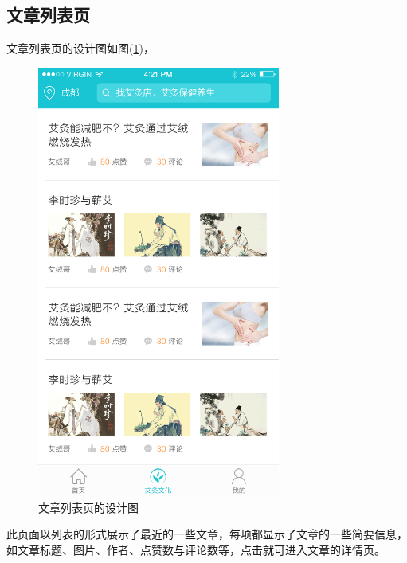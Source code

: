     \subsection{文章列表页}
      \label{subsec:文章列表页}
        文章列表页的设计图如图(\ref{fig:artlist_dsn})，
        \begin{figure}[htbp]
          \centering
          \includegraphics[width=8cm]{./img/artlist_dsn.png}
          \caption{文章列表页的设计图}
          \label{fig:artlist_dsn}
        \end{figure}
        此页面以列表的形式展示了最近的一些文章，每项都显示了文章的一些简要信息，如文章标题、图片、作者、点赞数与评论数等，点击就可进入文章的详情页。


